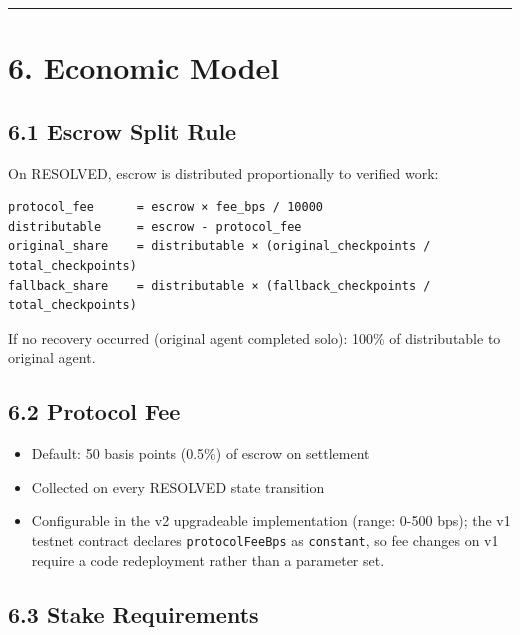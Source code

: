 \documentclass[
  10pt,
]{article}
\providecommand{\tightlist}{%
  \setlength{\itemsep}{0pt}\setlength{\parskip}{0pt}}
\begin{document}
\begin{center}\rule{0.5\linewidth}{0.5pt}\end{center}

\hypertarget{economic-model}{%
\section{6. Economic Model}\label{economic-model}}

\hypertarget{escrow-split-rule}{%
\subsection{6.1 Escrow Split Rule}\label{escrow-split-rule}}

On RESOLVED, escrow is distributed proportionally to verified work:

\begin{verbatim}
protocol_fee      = escrow × fee_bps / 10000
distributable     = escrow - protocol_fee
original_share    = distributable × (original_checkpoints / total_checkpoints)
fallback_share    = distributable × (fallback_checkpoints / total_checkpoints)
\end{verbatim}

If no recovery occurred (original agent completed solo): 100\% of
distributable to original agent.

\hypertarget{protocol-fee}{%
\subsection{6.2 Protocol Fee}\label{protocol-fee}}

\begin{itemize}
\tightlist
\item
  Default: 50 basis points (0.5\%) of escrow on settlement
\item
  Collected on every RESOLVED state transition
\item
  Configurable in the v2 upgradeable implementation (range: 0-500 bps);
  the v1 testnet contract declares \texttt{protocolFeeBps} as
  \texttt{constant}, so fee changes on v1 require a code redeployment
  rather than a parameter set.
\end{itemize}

\hypertarget{stake-requirements}{%
\subsection{6.3 Stake Requirements}\label{stake-requirements}}
\end{document}
